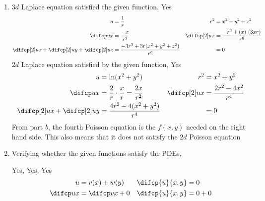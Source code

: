 \begin{enumerate}
\begin{enumerate}
              \item $3d$ Laplace equation satisfied the given function,
                    \textcolor{y_h}{Yes}
                    \begin{align}
                        u              & = \frac{1}{r}                              &
                        r^2            & = x^2 + y^2 + z^2                            \\
                        \difcp ux      & = \frac{-x}{r^3}                           &
                        \difcp[2] ux   & = \frac{-r^3 + (x)\ (3xr)}{r^6}              \\
                        \difcp[2] ux + \difcp[2] uy
                        + \difcp[2] uz & = \frac{-3r^3 + 3r (x^2 + y^2 + z^2)}{r^6} &
                                       & = 0
                    \end{align}
                    $2d$ Laplace equation satisfied by the given function,
                    \textcolor{y_h}{Yes}
                    \begin{align}
                        u                & = \ln(x^2 + y^2)                  &
                        r^2              & = x^2 + y^2                         \\
                        \difcp ux        & = \frac{2}{r} \cdot \frac{x}{r}
                        = \frac{2x}{r^2} &
                        \difcp[2] ux     & = \frac{2r^2 - 4x^2}{r^4}           \\
                        \difcp[2] ux
                        + \difcp[2] uy   & = \frac{4r^2 - 4(x^2 + y^2)}{r^4} &
                                         & = 0
                    \end{align}
                    From part $ b $, the fourth Poisson equation is the $ f(x, y) $
                    needed on the right hand side. This also means that it does not
                    satisfy the $2d$ Poisson equation
              \item Verifying whether the given functions satisfy the PDEs, \par
                    \textcolor{y_h}{Yes}, \textcolor{y_h}{Yes}, \textcolor{y_h}{Yes}
                    \begin{align}
                        u               & = v(x) + w(y)   &
                        \difcp{u}{x, y} & = 0               \\
                        \difcp ux       & = \difcp vx + 0 &
                        \difcp{u}{x, y} & = 0 + 0
                    \end{align}

\end{enumerate}
\end{enumerate}
